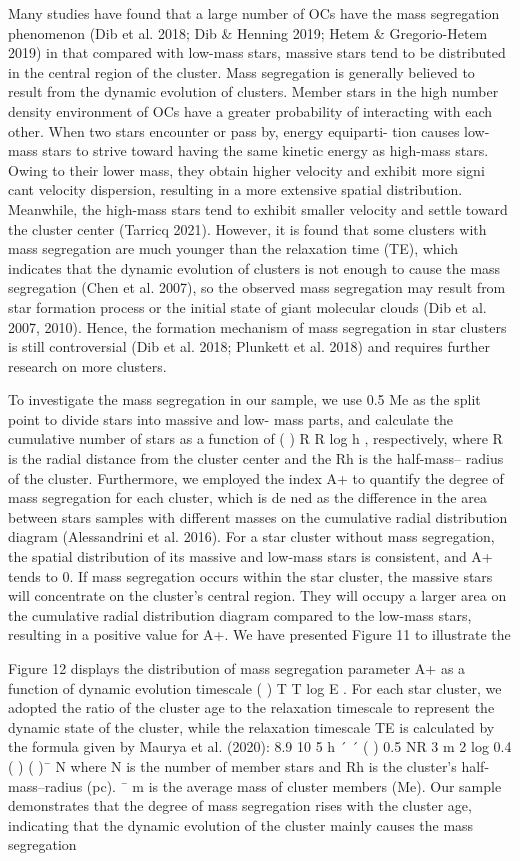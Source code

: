 \documentclass[../main.tex]{subfiles}
\begin{document}
{Many studies have found that a large number of OCs have
the mass segregation phenomenon (Dib et al. 2018; Dib &
Henning 2019; Hetem & Gregorio-Hetem 2019) in that
compared with low-mass stars, massive stars tend to be
distributed in the central region of the cluster. Mass segregation
is generally believed to result from the dynamic evolution of
clusters. Member stars in the high number density environment
of OCs have a greater probability of interacting with each
other. When two stars encounter or pass by, energy equiparti-
tion causes low-mass stars to strive toward having the same
kinetic energy as high-mass stars. Owing to their lower mass,
they obtain higher velocity and exhibit more signi cant
velocity dispersion, resulting in a more extensive spatial
distribution. Meanwhile, the high-mass stars tend to exhibit
smaller velocity and settle toward the cluster center (Tarricq
2021). However, it is found that some clusters with mass
segregation are much younger than the relaxation time (TE),
which indicates that the dynamic evolution of clusters is not
enough to cause the mass segregation (Chen et al. 2007), so the
observed mass segregation may result from star formation
process or the initial state of giant molecular clouds (Dib et al.
2007, 2010). Hence, the formation mechanism of mass
segregation in star clusters is still controversial (Dib et al.
2018; Plunkett et al. 2018) and requires further research on
more clusters.

To investigate the mass segregation in our sample, we use
0.5 Me as the split point to divide stars into massive and low-
mass parts, and calculate the cumulative number of stars as a
function of ( ) R R
log h , respectively, where R is the radial
distance from the cluster center and the Rh is the half-mass–
radius of the cluster. Furthermore, we employed the index A+
to quantify the degree of mass segregation for each cluster,
which is de ned as the difference in the area between stars
samples with different masses on the cumulative radial
distribution diagram (Alessandrini et al. 2016). For a star
cluster without mass segregation, the spatial distribution of its
massive and low-mass stars is consistent, and A+ tends to 0. If
mass segregation occurs within the star cluster, the massive
stars will concentrate on the cluster’s central region. They will
occupy a larger area on the cumulative radial distribution
diagram compared to the low-mass stars, resulting in a positive
value for A+. We have presented Figure 11 to illustrate the

Figure 12 displays the distribution of mass segregation
parameter A+ as a function of dynamic evolution timescale
( ) T T
log E . For each star cluster, we adopted the ratio of the
cluster age to the relaxation timescale to represent the dynamic
state of the cluster, while the relaxation timescale TE is
calculated by the formula given by Maurya et al. (2020):
8.9 10
5
h
´ ´
( )
0.5
NR
3
m
2
log 0.4
( ) ( )¯
N
where N is the number of member stars and Rh is the cluster’s
half-mass–radius (pc).
¯
m is the average mass of cluster
members (Me). Our sample demonstrates that the degree of
mass segregation rises with the cluster age, indicating that the
dynamic evolution of the cluster mainly causes the mass
segregation

}
\end{document}
